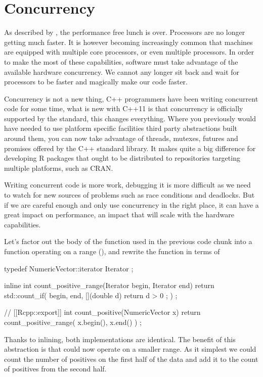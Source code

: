 \section{Concurrency}

As described by \citep{sutter2005}, the performance free lunch is over. Processors
are no longer getting much faster. It is however becoming
increasingly common that machines are equipped with multiple core processors, or
even multiple processors. In order to make the most of these
capabilities, software must take advantage of the available hardware
concurrency. We cannot any longer sit back and wait for processors to be faster
and magically make our code faster.

Concurrency is not a new thing, C++ programmers have been writing concurrent
code for some time, what is new with C++11 is that concurrency
is officially supported by the standard, this changes everything.
Where you previously would have needed to use platform specific facilities
third party abstractions built around them, you can now take advantage
of threads, mutexes, futures and promises offered by the C++ standard
library. It makes quite a big difference for developing
R packages that ought to be distributed to repositories targeting
multiple platforms, such as CRAN.

Writing concurrent code is more work, debugging it is more difficult as we need
to watch for new sources of problems such as race conditions and deadlocks. But
if we are careful enough and only use concurrency in the right place, it can
have a great impact on performance, an impact that will scale with the
hardware capabilities.

Let's factor out the body of the function used in the previous code chunk
into a function operating on a range (),
and rewrite the  function in terms of

\begin{example}
typedef NumericVector::iterator Iterator ;

inline int count_positive_range(Iterator begin, Iterator end){
  return std::count_if( begin, end,
    [](double d){ return d > 0 ;}
  ) ;
}

// [[Rcpp::export]]
int count_positive(NumericVector x){
  return count_positive_range( x.begin(), x.end() ) ;
}
\end{example}

Thanks to inlining, both implementations are identical. The benefit of
this abstraction is that  could now
operate on a smaller range. As it simplest we could count the
number of positives on the first half of the data and add it to
the count of positives from the second half.


